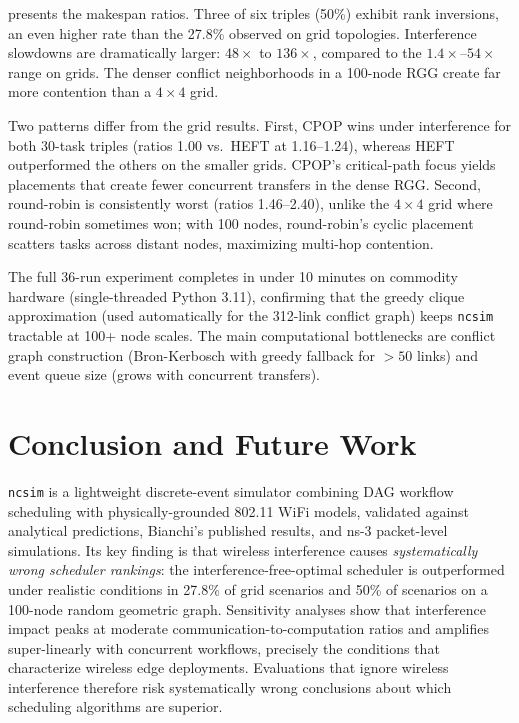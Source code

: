\documentclass[conference]{IEEEtran}
\newcommand{\ncsim}{\texttt{ncsim}}
\begin{document}
 presents the makespan ratios.
Three of six triples (50\%) exhibit rank inversions, an even higher
rate than the 27.8\% observed on grid topologies.  Interference
slowdowns are dramatically larger: $48\times$ to $136\times$, compared
to the $1.4\times$--$54\times$ range on grids.  The denser conflict
neighborhoods in a 100-node RGG create far more contention than a
$4\times4$ grid.

Two patterns differ from the grid results.  First, CPOP wins under
interference for both 30-task triples (ratios 1.00 vs.\ HEFT at
1.16--1.24), whereas HEFT outperformed the others on the smaller
grids.  CPOP's critical-path focus yields placements that create fewer
concurrent transfers in the dense RGG.  Second, round-robin is consistently
worst (ratios 1.46--2.40), unlike the $4\times4$ grid where round-robin
sometimes won; with 100 nodes, round-robin's cyclic placement
scatters tasks across distant nodes, maximizing multi-hop contention.

The full 36-run experiment completes in under 10 minutes on commodity
hardware (single-threaded Python 3.11), confirming that the greedy
clique approximation (used automatically for the 312-link conflict
graph) keeps \ncsim{} tractable at 100+ node scales.  The main
computational bottlenecks are conflict graph construction (Bron-Kerbosch
with greedy fallback for $>50$ links) and event queue size (grows with
concurrent transfers).


\section{Conclusion and Future Work}
\label{sec:conclusion}

\ncsim{} is a lightweight discrete-event simulator combining DAG
workflow scheduling with physically-grounded 802.11 WiFi models,
validated against analytical predictions, Bianchi's published results,
and ns-3 packet-level simulations.  Its key finding is that wireless
interference causes \emph{systematically wrong scheduler rankings}:
the interference-free-optimal scheduler is outperformed under
realistic conditions in 27.8\% of grid scenarios and 50\% of scenarios
on a 100-node random geometric graph.  Sensitivity analyses show that
interference impact peaks at moderate communication-to-computation
ratios and amplifies super-linearly with concurrent workflows,
precisely the conditions that characterize wireless edge deployments.
Evaluations that ignore wireless interference therefore risk
systematically wrong conclusions about which scheduling algorithms
are superior.
\end{document}
